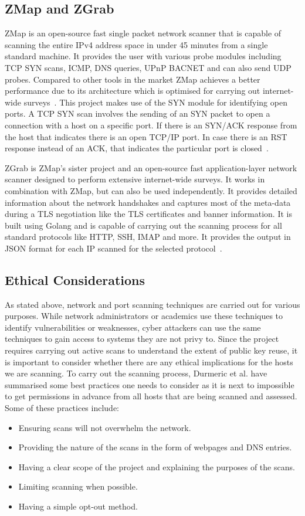 \subsection{ZMap and ZGrab}
ZMap is an open-source fast single packet network scanner that is capable of scanning the entire IPv4 address space in under 45 minutes 
from a single standard machine. It provides the user with various probe modules including TCP SYN scans, ICMP, DNS queries, UPnP BACNET and can also send UDP probes.
Compared to other tools in the market ZMap achieves a better performance due to its architecture which is optimised for carrying out 
internet-wide surveys~\cite{182948}. This project makes use of the SYN module for identifying open ports. A TCP SYN scan involves the sending of an 
SYN packet to open a connection with a host on a specific port. If there is an SYN/ACK response from the host that indicates there is an open TCP/IP port. 
In case there is an RST response instead of an ACK, that indicates the particular port is closed~\cite{SYN}.

\noindent ZGrab is ZMap's sister project and an open-source fast application-layer network scanner designed to perform extensive internet-wide surveys. 
It works in combination with ZMap, but can also be used independently. It provides detailed information about the network handshakes and captures 
most of the meta-data during a TLS negotiation like the TLS certificates and banner information. It is built using Golang and is capable of carrying 
out the scanning process for all standard protocols like HTTP, SSH, IMAP and more. It provides the output in JSON format for each IP scanned for 
the selected protocol~\cite{zgrab2Github}.
\pagebreak

\subsection{Ethical Considerations}   
As stated above, network and port scanning techniques are carried out for various purposes. While network 
administrators or academics use these techniques to identify vulnerabilities or weaknesses, cyber attackers can use the same techniques to 
gain access to systems they are not privy to. Since the project requires carrying out active scans to understand the extent of public key reuse, it is 
important to consider whether there are any ethical implications for the hosts we are scanning. To carry out the scanning process, 
Durmeric et al. \cite{182948} have summarised some best practices one needs to consider as it is next to impossible to get permissions in advance 
from all hosts that are being scanned and assessed. Some of these practices include:
\begin{itemize}
    \item Ensuring scans will not overwhelm the network.
    \item Providing the nature of the scans in the form of webpages and DNS entries.
    \item Having a clear scope of the project and explaining the purposes of the scans.
    \item Limiting scanning when possible.
    \item Having a simple opt-out method.
\end{itemize}

